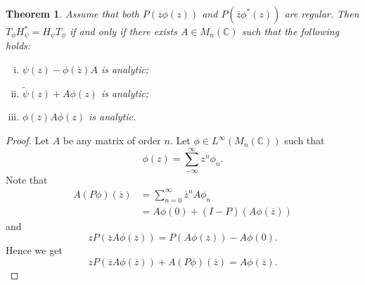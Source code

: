 \documentclass[12pt, reqno]{amsart}
\newtheorem{theorem}{Theorem}[section]
\theoremstyle{definition}
\theoremstyle{remark}
\numberwithin{equation}{section}
\newcommand{\li}{L^\infty}
\begin{document}
    \begin{theorem}\label{Th1}
        Assume that both $P(\overline z\phi(z))$ and $P(\overline z\phi^*(z))$ are regular. Then $T_\phi H_\psi^* =H_\psi T_\phi$  if and only if there exists $A\in M_n(\mathbb{C})$ such that the following holds:
        \begin{enumerate}[(i)]
            \item $\psi(z)-\phi(\overline z)A$ is analytic;\label{1i}
            \item $\tilde\psi(z)+A\phi(z)$ is analytic;\label{1ii}
            \item $\phi(\overline z)A\phi(z)$ is analytic.\label{1iii}
        \end{enumerate}
    \end{theorem}
        \begin{proof}
        Let $A$ be any matrix of order $n$. Let $\phi \in \li(M_n(\mathbb{C}))$ such that
        $$
        \phi(z)=\sum_{-\infty}^{\infty} z^n\phi_n.
         $$
        Note that 
            \begin{align*}
                A(P\phi)(\overline z)&= \sum_{n=0}^{\infty} \overline{z} ^n A\phi_n\\
                &=A\phi(0)+(I-P)(A\phi(\overline z))
             \end{align*}
        and
             $$
            zP(\overline z A\phi(\overline z))=P(A\phi(\overline z)) -A\phi(0).
            $$
        Hence we get
        \begin{equation}\label{symbol-1}
            zP(\overline z A\phi(\overline z))+A(P\phi)(\overline z)=A\phi(\overline z).
        \end{equation}
        

\end{proof}
\end{document}
